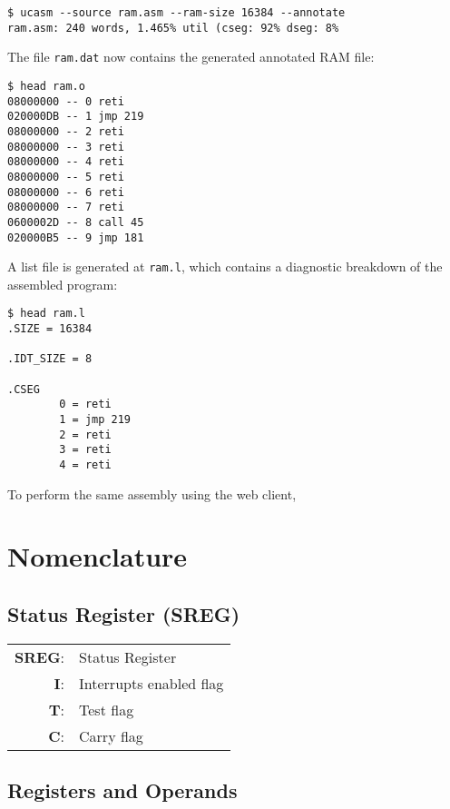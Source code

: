 \documentclass[12pt,twoside]{report}
\begin{document}
\begin{verbatim}
$ ucasm --source ram.asm --ram-size 16384 --annotate
ram.asm: 240 words, 1.465% util (cseg: 92% dseg: 8%
\end{verbatim}

The file \texttt{ram.dat} now contains the generated annotated RAM
file:

\begin{verbatim}
$ head ram.o
08000000 -- 0 reti
020000DB -- 1 jmp 219
08000000 -- 2 reti
08000000 -- 3 reti
08000000 -- 4 reti
08000000 -- 5 reti
08000000 -- 6 reti
08000000 -- 7 reti
0600002D -- 8 call 45
020000B5 -- 9 jmp 181
\end{verbatim}

A list file is generated at \texttt{ram.l}, which contains a
diagnostic breakdown of the assembled program:

\begin{verbatim}
$ head ram.l
.SIZE = 16384

.IDT_SIZE = 8

.CSEG
        0 = reti
        1 = jmp 219
        2 = reti
        3 = reti
        4 = reti
\end{verbatim}

To perform the same assembly using the web client,


\section{Nomenclature}

\subsection{Status Register (SREG)}

\begin{tabular}{ | r | l | }
  \hline
  \textbf{SREG}: & Status Register \\
  \textbf{I}: & Interrupts enabled flag \\
  \textbf{T}: & Test flag \\
  \textbf{C}: & Carry flag \\
  \hline
\end{tabular}

\subsection{Registers and Operands}
\end{document}
